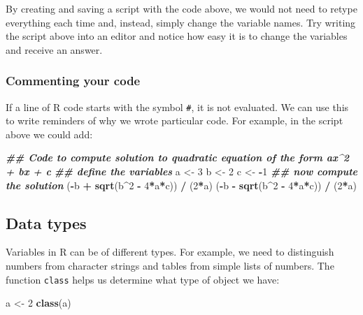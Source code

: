 \documentclass[
]{article}
\newenvironment{Shaded}{\begin{snugshade}}{\end{snugshade}}
\newcommand{\DecValTok}[1]{\textcolor[rgb]{0.00,0.00,0.81}{#1}}
\newcommand{\DocumentationTok}[1]{\textcolor[rgb]{0.56,0.35,0.01}{\textbf{\textit{#1}}}}
\newcommand{\FunctionTok}[1]{\textcolor[rgb]{0.13,0.29,0.53}{\textbf{#1}}}
\newcommand{\NormalTok}[1]{#1}
\newcommand{\OtherTok}[1]{\textcolor[rgb]{0.56,0.35,0.01}{#1}}
\newcommand{\SpecialCharTok}[1]{\textcolor[rgb]{0.81,0.36,0.00}{\textbf{#1}}}
\begin{document}
By creating and saving a script with the code above, we would not need
to retype everything each time and, instead, simply change the variable
names. Try writing the script above into an editor and notice how easy
it is to change the variables and receive an answer.

\subsubsection{Commenting your code}\label{commenting-your-code}

If a line of R code starts with the symbol \texttt{\#}, it is not
evaluated. We can use this to write reminders of why we wrote particular
code. For example, in the script above we could add:

\begin{Shaded}
\begin{Highlighting}[]
\DocumentationTok{\#\# Code to compute solution to quadratic equation of the form ax\^{}2 + bx + c}
\DocumentationTok{\#\# define the variables}
\NormalTok{a }\OtherTok{\textless{}{-}} \DecValTok{3} 
\NormalTok{b }\OtherTok{\textless{}{-}} \DecValTok{2}
\NormalTok{c }\OtherTok{\textless{}{-}} \SpecialCharTok{{-}}\DecValTok{1}
\DocumentationTok{\#\# now compute the solution}
\NormalTok{(}\SpecialCharTok{{-}}\NormalTok{b }\SpecialCharTok{+} \FunctionTok{sqrt}\NormalTok{(b}\SpecialCharTok{\^{}}\DecValTok{2} \SpecialCharTok{{-}} \DecValTok{4}\SpecialCharTok{*}\NormalTok{a}\SpecialCharTok{*}\NormalTok{c)) }\SpecialCharTok{/}\NormalTok{ (}\DecValTok{2}\SpecialCharTok{*}\NormalTok{a)}
\NormalTok{(}\SpecialCharTok{{-}}\NormalTok{b }\SpecialCharTok{{-}} \FunctionTok{sqrt}\NormalTok{(b}\SpecialCharTok{\^{}}\DecValTok{2} \SpecialCharTok{{-}} \DecValTok{4}\SpecialCharTok{*}\NormalTok{a}\SpecialCharTok{*}\NormalTok{c)) }\SpecialCharTok{/}\NormalTok{ (}\DecValTok{2}\SpecialCharTok{*}\NormalTok{a)}
\end{Highlighting}
\end{Shaded}

\subsection{Data types}\label{data-types}

Variables in R can be of different types. For example, we need to
distinguish numbers from character strings and tables from simple lists
of numbers. The function \texttt{class} helps us determine what type of
object we have:

\begin{Shaded}
\begin{Highlighting}[]
\NormalTok{a }\OtherTok{\textless{}{-}} \DecValTok{2}
\FunctionTok{class}\NormalTok{(a)}
\end{Highlighting}
\end{Shaded}
\end{document}
